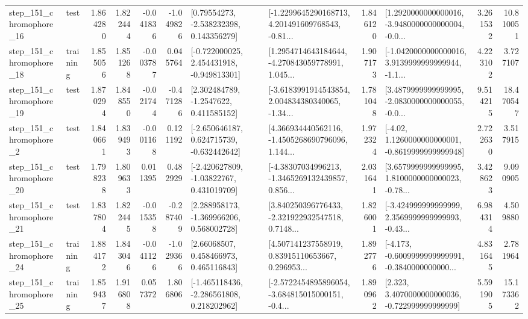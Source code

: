 \begin{tabular}{llrrrrllrlrr}
  step\_151\_chromophore\_16 &      test &      1.864280 &    1.822444 &     -0.041836 & -1.049826 &     [0.79554273, -2.538232398, 0.143356279] &  [-1.2299645290168713, 4.201491609768543, -0.81... &       1.846120 &  [1.2920000000000016, -3.9480000000000004, -0.0... &            3.261532 &         10.810051 \\
  step\_151\_chromophore\_18 &  training &      1.855056 &    1.851268 &     -0.003787 &  0.045764 &   [-0.722000025, 2.454431918, -0.949813301] &  [1.2954714643184644, -4.270843059778991, 1.045... &       1.907173 &  [-1.0420000000000016, 3.9139999999999944, -1.1... &            4.223102 &          3.727107 \\
  step\_151\_chromophore\_19 &      test &      1.870294 &    1.848550 &     -0.021744 & -0.471286 &      [2.302484789, -1.2547622, 0.411585152] &  [-3.6183991914543854, 2.004834380340065, -1.34... &       1.781048 &  [3.4879999999999995, -2.0830000000000055, -0.0... &            9.514215 &         18.470547 \\
   step\_151\_chromophore\_2 &      test &      1.840661 &    1.839493 &     -0.001168 &  0.121192 &   [-2.650646187, 0.624715739, -0.632442642] &  [4.366934440562116, -1.4505268690796096, 1.144... &       1.972324 &   [-4.02, 1.1260000000000001, -0.8619999999999948] &            2.722630 &          3.517915 \\
  step\_151\_chromophore\_20 &      test &      1.798238 &    1.809633 &      0.011395 &  0.482929 &    [-2.420627809, -1.03822767, 0.431019709] &  [-4.38307034996213, -1.3465269132439857, 0.856... &       2.031641 &  [3.6579999999999995, 1.8100000000000023, -0.78... &            3.428623 &          9.090905 \\
  step\_151\_chromophore\_21 &      test &      1.837804 &    1.822445 &     -0.015358 & -0.287409 &    [2.288958173, -1.369966206, 0.568002728] &  [3.840250396776433, -2.321922932547518, 0.7148... &       1.826001 &  [-3.424999999999999, 2.3569999999999993, -0.43... &            6.984314 &          4.509880 \\
  step\_151\_chromophore\_24 &  training &      1.884172 &    1.843046 &     -0.041126 & -1.029366 &      [2.66068507, 0.458466973, 0.465116843] &  [4.507141237558919, 0.83915110653667, 0.296953... &       1.892776 &  [-4.173, -0.6009999999999991, -0.3840000000000... &            4.831645 &          2.781964 \\
  step\_151\_chromophore\_25 &  training &      1.859437 &    1.916808 &      0.057372 &  1.806806 &   [-1.465118436, -2.286561808, 0.218202962] &  [-2.5722454895896054, -3.684815015000151, -0.4... &       1.890962 &    [2.323, 3.4070000000000036, -0.722999999999999] &            5.591905 &         15.173362 \\

\end{tabular}
